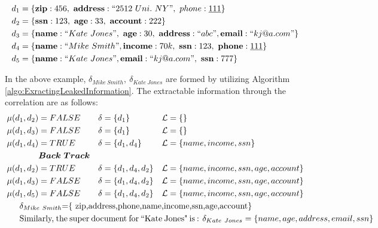 \begin{align*}
d_1&=\{ {\bf zip} : 456 ,~{\bf address}:``2512~ Uni.~NY",~ phone:\underline{111}\}\\
d_2&=\{ {\bf ssn} : 123,~ {\bf age} : 33,~ {\bf account}: 222 \}\\
d_3&=\{ {\bf name} : ``Kate~Jones",~ {\bf age} : 30,~ {\bf address}: ``abc",{\bf email}:``kj@a.com" \}\\
d_4&=\{ {\bf name} : ``Mike~Smith", {\bf income} :70k,~ {\bf ssn}:123, ~ {\bf phone}:\underline{111}\}\\
d_5&=\{ {\bf name} : ``Kate~Jones",{\bf email}:``kj@a.com",~ {\bf ssn} : 777\}
\end{align*}


\noindent In the above example, $\delta_{Mike~Smith},~\delta_{Kate~Jones}$ are formed by utilizing Algorithm \ref{algo:ExractingLeakedInformation}. The extractable information through the correlation are as follows:
\begin{align*}
\mu(d_1,d_2)&=FALSE & \delta&=\{d_1\}& \mathcal{L}&=\{\}\\
\mu(d_1,d_3)&=FALSE & \delta&=\{d_1\}& \mathcal{L}&=\{\}\\
\mu(d_1,d_4)&=TRUE  & \delta&=\{d_1, d_4\}& \mathcal{L}&=\{name,income,ssn\}\\
&\bm{Back~Track} &&&&\\
\mu(d_1,d_2)&=TRUE  & \delta&=\{d_1, d_4, d_2\}& \mathcal{L}&=\{name,income,ssn, age, account\}\\
\mu(d_1,d_3)&=FALSE  &\delta&=\{d_1, d_4, d_2\}& \mathcal{L}&=\{name,income,ssn, age, account\}\\
\mu(d_1,d_5)&=FALSE  &\delta&=\{d_1, d_4, d_2\}& \mathcal{L}&=\{name,income,ssn, age, account\}\\
\noalign{$\delta_{Mike~Smith}$=\{ zip,address,phone,name,income,ssn,age,account\}}
\noalign{Similarly, the super document for ``Kate Jones" is : $\delta_{Kate~Jones}=\{ name, age, address, email, ssn\}$}
\end{align*}

